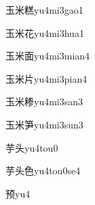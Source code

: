 \begin{verbete}[5;6;16]{玉米糕}{yu4mi3gao1}
\end{verbete}                                                                                                                       

\begin{verbete}[5;6;7]{玉米花}{yu4mi3hua1}
\end{verbete}                                                                                                                       

\begin{verbete}[5;6;9]{玉米面}{yu4mi3mian4}
\end{verbete}                                                                                                                       

\begin{verbete}[5;6;4]{玉米片}{yu4mi3pian4}
\end{verbete}                                                                                                                       

\begin{verbete}[5;6;14]{玉米糁}{yu4mi3san3}
\end{verbete}                                                                                                                       

\begin{verbete}[5;6;10]{玉米笋}{yu4mi3sun3}
\end{verbete}                                                                                                                       

\begin{verbete}[6;5]{芋头}{yu4tou0}
\end{verbete}

\begin{verbete}[6;5;6]{芋头色}{yu4tou0se4}
\end{verbete}

\begin{verbete}[10]{预}{yu4}
\end{verbete}

